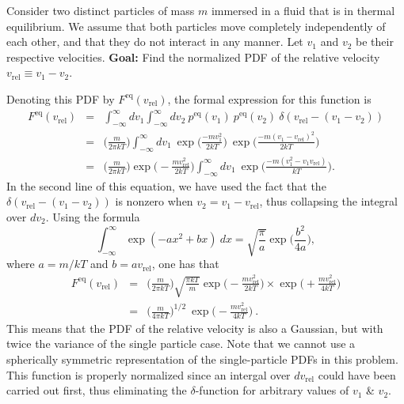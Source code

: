 
Consider two distinct particles of mass $m$ immersed in a fluid that is in thermal equilibrium. We assume that both particles move completely independently of each other, and that they do not interact in any manner. Let $v_1$ and $v_2$ be their respective velocities. \textbf{Goal:} Find the normalized PDF of the relative velocity $v_\text{rel} \equiv v_1-v_2$.

Denoting this PDF by $F^\text{eq}(v_\text{rel})$, the formal expression for this function is
\begin{eqnarray}
F^\text{eq}(v_\text{rel}) &=& \int_{-\infty}^{\infty} dv_1 \int_{-\infty}^{\infty} dv_2 ~ p^\text{eq}(v_1) ~ p^\text{eq}(v_2) ~ \delta(v_\text{rel} - (v_1-v_2)) \nonumber \\
&=& \bigg( \frac{m}{2\pi k T}\bigg) \int_{-\infty}^{\infty} dv_1 ~ \exp\bigg(\frac{-m v_1^2}{2 k T}\bigg)~\exp\bigg(\frac{-m (v_1-v_\text{rel})^2}{2 k T}\bigg) \nonumber \\
&=& \bigg( \frac{m}{2\pi k T}\bigg) \exp\bigg(-\frac{m v_\text{rel}^2}{2 k T}\bigg) \int_{-\infty}^{\infty} dv_1 ~\exp\bigg(\frac{-m (v_1^2-v_1 v_\text{rel})}{k T}\bigg). \nonumber
\end{eqnarray}
In the second line of this equation, we have used the fact that the $\delta(v_\text{rel} - (v_1-v_2))$ is nonzero when $v_2=v_1-v_\text{rel}$, thus collapsing the integral over $dv_2$.
Using the formula
\begin{equation}
\int_{-\infty}^{\infty} \exp(-a x^2 + bx)~dx = \sqrt{\frac{\pi}{a}} \exp\bigg(\frac{b^2}{4a}\bigg), \nonumber
\end{equation}
where $a=m/k T$ and $b = a v_\text{rel}$, one has that
\begin{eqnarray}
F^\text{eq}(v_\text{rel}) &=& \bigg( \frac{m}{2\pi k T}\bigg) \sqrt{\frac{\pi k T}{m}} \exp\bigg(-\frac{m v_\text{rel}^2}{2 k T}\bigg) \times \exp\bigg(+\frac{m v_\text{rel}^2}{4 k T}\bigg) \nonumber \\
&=& \boxed{\bigg( \frac{m}{4\pi k T}\bigg)^{1/2} ~ \exp\bigg(-\frac{m v_\text{rel}^2}{4 k T}\bigg)}~.
\end{eqnarray}
This means that the PDF of the relative velocity is also a Gaussian, but with twice the variance of the single particle case. Note that we cannot use a spherically symmetric representation of the single-particle PDFs in this problem. This function is properly normalized since an intergal over $d v_\text{rel}$ could have been carried out first, thus eliminating the $\delta$-function for arbitrary values of $v_1$ \& $v_2$.